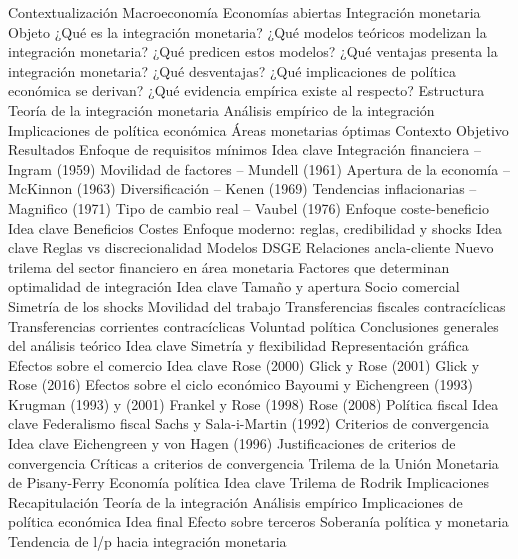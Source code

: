\documentclass{nuevotema}
\begin{document}
\begin{esquema}[enumerate]
	\1[] 
		\2 Contextualización
			\3 Macroeconomía
			\3 Economías abiertas
			\3 Integración monetaria
		\2 Objeto
			\3 ¿Qué es la integración monetaria?
			\3 ¿Qué modelos teóricos modelizan la integración monetaria?
			\3 ¿Qué predicen estos modelos?
			\3 ¿Qué ventajas presenta la integración monetaria?
			\3 ¿Qué desventajas?
			\3 ¿Qué implicaciones de política económica se derivan?
			\3 ¿Qué evidencia empírica existe al respecto?
		\2 Estructura
			\3 Teoría de la integración monetaria
			\3 Análisis empírico de la integración
			\3 Implicaciones de política económica
	\1 
		\2 Áreas monetarias óptimas
			\3 Contexto
			\3 Objetivo
			\3 Resultados
		\2 Enfoque de requisitos mínimos
			\3 Idea clave
			\3 Integración financiera -- Ingram (1959)
			\3 Movilidad de factores -- Mundell (1961)
			\3 Apertura de la economía -- McKinnon (1963)
			\3 Diversificación -- Kenen (1969)
			\3 Tendencias inflacionarias -- Magnifico (1971)
			\3 Tipo de cambio real -- Vaubel (1976)
		\2 Enfoque coste-beneficio
			\3 Idea clave
			\3 Beneficios
			\3 Costes
		\2 Enfoque moderno: reglas, credibilidad y shocks
			\3 Idea clave
			\3 Reglas vs discrecionalidad
			\3 Modelos DSGE
			\3 Relaciones ancla-cliente
			\3 Nuevo trilema del sector financiero en área monetaria
		\2 Factores que determinan optimalidad de integración
			\3 Idea clave
			\3[\textsc{i}] Tamaño y apertura
			\3[\textsc{ii}] Socio comercial
			 Simetría de los shocks
			\3[\textsc{iv}] Movilidad del trabajo
			\3[\textsc{v}] Transferencias fiscales contracíclicas
			\3[\textsc{vi}] Transferencias corrientes contracíclicas
			 Voluntad política
		\2 Conclusiones generales del análisis teórico
			\3 Idea clave
			\3 Simetría y flexibilidad
			\3 Representación gráfica
	\1 
		\2 Efectos sobre el comercio
			\3 Idea clave
			\3 Rose (2000)
			\3 Glick y Rose (2001)
			\3 Glick y Rose (2016)
		\2 Efectos sobre el ciclo económico
			\3 Bayoumi y Eichengreen (1993)
			\3 Krugman (1993) y (2001)
			\3 Frankel y Rose (1998)
			\3 Rose (2008)
	\1 
		\2 Política fiscal
			\3 Idea clave
			\3 Federalismo fiscal
			\3 Sachs y Sala-i-Martin (1992)
		\2 Criterios de convergencia
			\3 Idea clave
			\3 Eichengreen y von Hagen (1996)
			\3 Justificaciones de criterios de convergencia
			\3 Críticas a criterios de convergencia
			\3 Trilema de la Unión Monetaria de Pisany-Ferry
		\2 Economía política
			\3 Idea clave
			\3 Trilema de Rodrik
			\3 Implicaciones
	\1[] 
		\2 Recapitulación
			\3 Teoría de la integración
			\3 Análisis empírico
			\3 Implicaciones de política económica
		\2 Idea final
			\3 Efecto sobre terceros
			\3 Soberanía política y monetaria
			\3 Tendencia de l/p hacia integración monetaria

\end{esquema}
\end{document}
